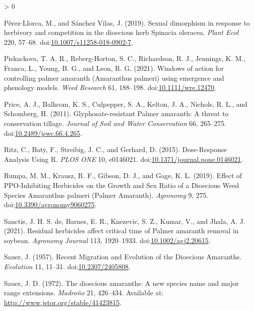 \documentclass[utf8]{frontiersSCNS}
\newlength{\cslhangindent}
\newenvironment{CSLReferences}[2] %
 {%
  \setlength{\parindent}{0pt}
  \ifodd #1 \everypar{\setlength{\hangindent}{\cslhangindent}}\ignorespaces\fi
  \ifnum #2 > 0
  \setlength{\parskip}{#2\baselineskip}
  \fi
 }%
 {}
\begin{document}
\begin{CSLReferences}{1}{0}
\leavevmode\hypertarget{ref-perez-llorca2019}{}%
Pérez-Llorca, M., and Sánchez Vilas, J. (2019). Sexual dimorphism in
response to herbivory and competition in the dioecious herb {Spinacia}
oleracea. \emph{Plant Ecol} 220, 57--68.
doi:\href{https://doi.org/10.1007/s11258-018-0902-7}{10.1007/s11258-018-0902-7}.

\leavevmode\hypertarget{ref-piskackova2021}{}%
Piskackova, T. A. R., Reberg-Horton, S. C., Richardson, R. J., Jennings,
K. M., Franca, L., Young, B. G., and Leon, R. G. (2021). Windows of
action for controlling palmer amaranth ({Amaranthus} palmeri) using
emergence and phenology models. \emph{Weed Research} 61, 188--198.
doi:\href{https://doi.org/10.1111/wre.12470}{10.1111/wre.12470}.

\leavevmode\hypertarget{ref-price2011}{}%
Price, A. J., Balkcom, K. S., Culpepper, S. A., Kelton, J. A., Nichols,
R. L., and Schomberg, H. (2011). Glyphosate-resistant {Palmer} amaranth:
{A} threat to conservation tillage. \emph{Journal of Soil and Water
Conservation} 66, 265--275.
doi:\href{https://doi.org/10.2489/jswc.66.4.265}{10.2489/jswc.66.4.265}.

\leavevmode\hypertarget{ref-ritz2015}{}%
Ritz, C., Baty, F., Streibig, J. C., and Gerhard, D. (2015).
Dose-{Response Analysis Using R}. \emph{PLOS ONE} 10, e0146021.
doi:\href{https://doi.org/10.1371/journal.pone.0146021}{10.1371/journal.pone.0146021}.

\leavevmode\hypertarget{ref-rumpa2019}{}%
Rumpa, M. M., Krausz, R. F., Gibson, D. J., and Gage, K. L. (2019).
Effect of {PPO}-{Inhibiting Herbicides} on the {Growth} and {Sex Ratio}
of a {Dioecious Weed Species Amaranthus} palmeri ({Palmer Amaranth}).
\emph{Agronomy} 9, 275.
doi:\href{https://doi.org/10.3390/agronomy9060275}{10.3390/agronomy9060275}.

\leavevmode\hypertarget{ref-sanctis2021}{}%
Sanctis, J. H. S. de, Barnes, E. R., Knezevic, S. Z., Kumar, V., and
Jhala, A. J. (2021). Residual herbicides affect critical time of
{Palmer} amaranth removal in soybean. \emph{Agronomy Journal} 113,
1920--1933.
doi:\href{https://doi.org/10.1002/agj2.20615}{10.1002/agj2.20615}.

\leavevmode\hypertarget{ref-sauer1957}{}%
Sauer, J. (1957). Recent {Migration} and {Evolution} of the {Dioecious
Amaranths}. \emph{Evolution} 11, 11--31.
doi:\href{https://doi.org/10.2307/2405808}{10.2307/2405808}.

\leavevmode\hypertarget{ref-sauer1972}{}%
Sauer, J. D. (1972). The dioecious amaranths: A new species name and
major range extensions. \emph{Madroño} 21, 426--434. Available at:
\url{http://www.jstor.org/stable/41423815}.


\end{CSLReferences}
\end{document}
